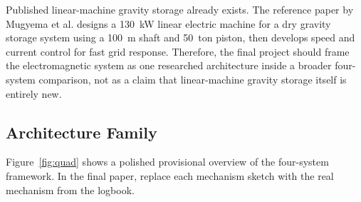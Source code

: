 \documentclass[10.5pt]{article}
\begin{document}
\begin{tcolorbox}[enhanced,colback=panel,colframe=linegray,boxrule=0.5pt,arc=2pt,title={Prior-art boundary},fonttitle=\bfseries]
Published linear-machine gravity storage already exists. The reference paper by Mugyema et al. designs a \SI{130}{kW} linear electric machine for a dry gravity storage system using a \SI{100}{m} shaft and \SI{50}{ton} piston, then develops speed and current control for fast grid response. Therefore, the final project should frame the electromagnetic system as one researched architecture inside a broader four-system comparison, not as a claim that linear-machine gravity storage itself is entirely new.
\end{tcolorbox}

\subsection{Architecture Family}
Figure~\ref{fig:quad} shows a polished provisional overview of the four-system framework. In the final paper, replace each mechanism sketch with the real mechanism from the logbook.
\end{document}
